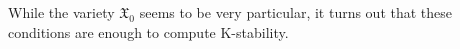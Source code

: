 \begin{remark}\leavevmode
While the variety \(\mathfrak{X}_0\) seems to be very particular, it turns out that these conditions are enough to compute K-stability.
\end{remark}
\iffalse
\subsubsection{Towards }

\begin{thing8}{Useful remark}[Fujita '16, BHJ'17 §4]\leavevmode
\[\begin{tikzcd}
&Y\arrow[dl,"f",swap]\arrow[dr,"g"]\\
\mathfrak{X}\arrow[rr,dashed]&&X \times \mathbb{A}^1
\end{tikzcd}\]
If \(\mathcal{L}=-K_{\mathfrak{X}/\mathbb{A}^1}\) and \(L=-K_X\) since \(K_{\mathbb{A}^1}=0\), we have
\begin{align*}
D&=
\end{align*}
\end{thing8}
\fi


